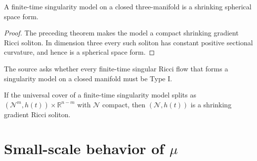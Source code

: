 \begin{corollary}
\label{cor:chow-iii-ch17-closed-three-model-round}


A finite-time singularity model on a closed three-manifold is a shrinking
spherical space form.
\end{corollary}
\begin{proof}
\sketch The preceding theorem makes the model a compact shrinking gradient Ricci
soliton.  In dimension three every such soliton has constant positive
sectional curvature, and hence is a spherical space form.
\end{proof}

\begin{remark}
\label{rem:chow-iii-ch17-compact-model-type-i-problem}

The source asks whether every finite-time singular Ricci flow that forms a
singularity model on a closed manifold must be Type I.
\end{remark}

\begin{remark}
\label{rem:chow-iii-ch17-compact-factor-shrinker}


If the universal cover of a finite-time singularity model splits as
$(\mathcal N^m,h(t))\times\mathbb R^{n-m}$ with $\mathcal N$ compact, then
$(\mathcal N,h(t))$ is a shrinking gradient Ricci soliton.
\end{remark}

\section{Small-scale behavior of \texorpdfstring{$\mu$}{mu}}

